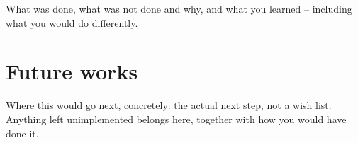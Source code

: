 \documentclass[11pt,a4paper]{scrartcl}
\begin{document}
\begin{guidance}
What was done, what was not done and why, and what you learned – including what you would do differently.
\end{guidance}

\section{Future works}
\label{sec:futureworks}

\begin{guidance}
Where this would go next, concretely: the actual next step, not a wish list. Anything left unimplemented belongs here, together with how you would have done it.
\end{guidance}



\end{document}
